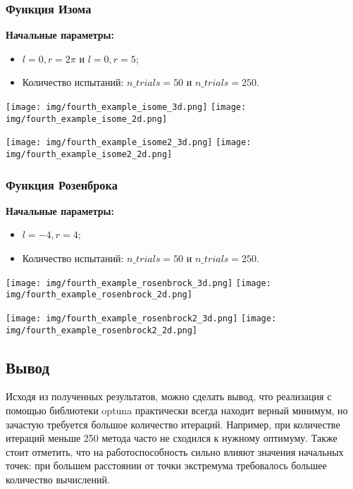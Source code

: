 \documentclass{article}
\begin{document}
\subsubsection*{Функция Изома}
\textbf{Начальные параметры:}
\begin{itemize}
    \item $l = 0, r = 2\pi$ и $l = 0, r = 5$;
    \item Количество испытаний: $n\_trials = 50$ и $n\_trials = 250$.
\end{itemize}
\begin{center}
    \texttt{[image: img/fourth\_example\_isome\_3d.png]}
    \texttt{[image: img/fourth\_example\_isome\_2d.png]}
    \label{fig:enter-label}
\end{center}
\begin{center}
    \texttt{[image: img/fourth\_example\_isome2\_3d.png]}
    \texttt{[image: img/fourth\_example\_isome2\_2d.png]}
    \label{fig:enter-label}
\end{center}
\subsubsection*{Функция Розенброка}
\textbf{Начальные параметры:}
\begin{itemize}
    \item $l = -4, r = 4$;
    \item Количество испытаний: $n\_trials = 50$ и $n\_trials = 250$.
\end{itemize}
\begin{center}
    \texttt{[image: img/fourth\_example\_rosenbrock\_3d.png]}
    \texttt{[image: img/fourth\_example\_rosenbrock\_2d.png]}
    \label{fig:enter-label}
\end{center}
\begin{center}
    \texttt{[image: img/fourth\_example\_rosenbrock2\_3d.png]}
    \texttt{[image: img/fourth\_example\_rosenbrock2\_2d.png]}
    \label{fig:enter-label}
\end{center}
\subsection*{Вывод}
Исходя из полученных результатов, можно сделать вывод, что реализация с помощью библиотеки optuna практически всегда находит верный минимум, но зачастую требуется большое количество итераций. Например, при количестве итераций меньше 250 метода часто не сходился к нужному оптимуму. Также стоит отметить, что на работоспособность сильно влияют значения начальных точек: при большем расстоянии от точки экстремума требовалось большее количество вычислений.
\end{document}
